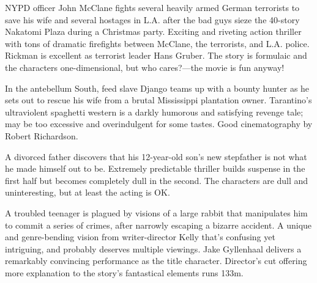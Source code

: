    NYPD officer John McClane fights several heavily armed German terrorists to save his wife and several hostages in L.A. after the bad guys sieze the 40-story Nakatomi Plaza during a Christmas party. Exciting and riveting action thriller with tons of dramatic firefights between McClane, the terrorists, and L.A. police. Rickman is excellent as terrorist leader Hans Gruber. The story is formulaic and the characters one-dimensional, but who cares?---the movie is fun anyway! \author{DW} 

   In the antebellum South, feed slave Django teams up with a bounty hunter as he sets out to rescue his wife from a brutal Mississippi plantation owner. Tarantino's ultraviolent spaghetti western is a darkly humorous and satisfying revenge tale; may be too excessive and overindulgent for some tastes. Good cinematography by Robert Richardson. \author{DW} 

   A divorced father discovers that his 12-year-old son's new stepfather is not what he made himself out to be. Extremely predictable thriller builds suspense in the first half but becomes completely dull in the second. The characters are dull and uninteresting, but at least the acting is OK. \author{DW} 

   A troubled teenager is plagued by visions of a large rabbit that manipulates him to commit a series of crimes, after narrowly escaping a bizarre accident. A unique and genre-bending vision from writer-director Kelly that's confusing yet intriguing, and probably deserves multiple viewings. Jake Gyllenhaal delivers a remarkably convincing performance as the title character. Director's cut offering more explanation to the story's fantastical elements runs 133m. \author{DW} 
